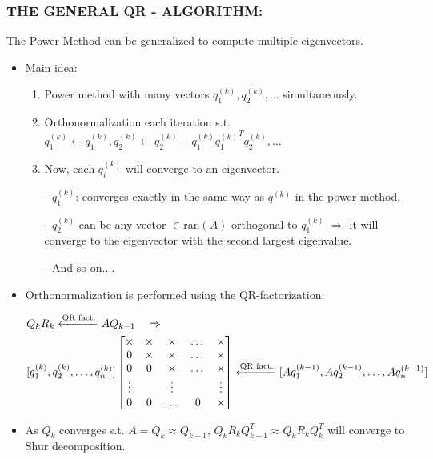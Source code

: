\documentclass[a4paper,8pt]{beamer} %
\newcommand{\ran}[1]{\text{ran}({#1})}
\newcommand{\smatrix}[1]{\left[\begin{matrix} #1 \end{matrix}\right]}
\begin{document}
\begin{frame} %
\frametitle{THE GENERAL QR - ALGORITHM:}
The Power Method can be generalized to compute multiple eigenvectors.
%
%
\begin{itemize}
	\item Main idea:
	\begin{enumerate}
		\item 
		Power method with many vectors $q^{(k)}_1,q^{(k)}_2,\dots$ simultaneously. 
		\item	
		Orthonormalization each iteration s.t. 
		$q^{(k)}_1\gets q^{(k)}_1, q^{(k)}_2 \gets q^{(k)}_2 - q^{(k)}_1 {q^{(k)}_1}^Tq^{(k)}_2, \dots$
		\item Now, each $q_i^{(k)}$ will converge to an eigenvector.
		\item[-] 
		$q_1^{(k)}$: converges exactly in the same way as $q^{(k)}$ in the power method.
		\item[-]
		$q_2^{(k)}$ can be any vector $\in\ran{A}$ orthogonal to $q_1^{(k)}$
		$\Rightarrow$ it will converge to the eigenvector with the second largest eigenvalue. 
		\item[-]
		And so on....
	\end{enumerate}
	\item Orthonormalization is performed using the QR-factorization:
	\begin{footnotesize}
		\begin{align}
		& Q_{k} R_k \xleftarrow{\text{QR fact.}} A Q_{k-1} \quad\Rightarrow \notag \\
		& [q^{(k)}_1,q^{(k)}_2,\dots, q_n^{(k)}] 
		\smatrix{\times & \times & \times & \dots & \times \\ 
				0 		& \times & \times & \dots & \times \\
				0 		& 0 	& \times & \dots & \times \\
				\vdots  & 		& \vdots & 	& 	\vdots \\
				0 & 0 & \dots & 0 & \times }
		\xleftarrow{\text{QR fact.}} [ Aq^{(k-1)}_1, Aq^{(k-1)}_2,\dots, Aq_n^{(k-1)}] 
		\label{eq:qr}
		\end{align}
	\end{footnotesize}
\item As $Q_k$ converges s.t. $A = Q_k\approx Q_{k-1}$, $Q_kR_kQ_{k-1}^T \approx Q_k R_k Q_k^T$
will converge to Shur decomposition.
\end{itemize}
\end{frame} %
\end{document}
